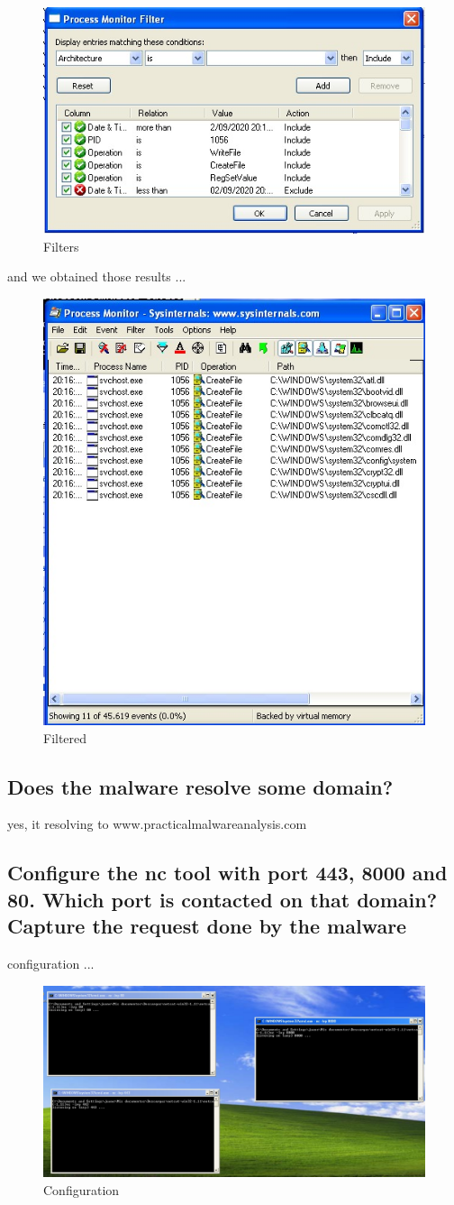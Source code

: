 \documentclass[12pt,letter]{article} %
\begin{document}
        \begin{figure}[h!]
            \centering
            \includegraphics[width=0.4\linewidth]{filters.jpeg}
            \caption{Filters}
            \label{fig:filters}
        \end{figure}
        and we obtained those results ...
        \begin{figure}[h!]
            \centering
            \includegraphics[width=0.5\linewidth]{filtered.jpeg}
            \caption{Filtered}
            \label{fig:filtered}
        \end{figure}

        \subsection{Does the malware resolve some domain? }
            yes, it resolving to www.practicalmalwareanalysis.com

        \subsection{Configure the nc tool with port 443, 8000 and 80. Which
        port is contacted on that domain? Capture the request done by the
        malware}
            configuration ...
            \begin{figure}[h!]
                \centering
                \includegraphics[width=0.6\linewidth]{tres.jpeg}
                \caption{Configuration}
                \label{configuration}
            \end{figure}
\end{document}
